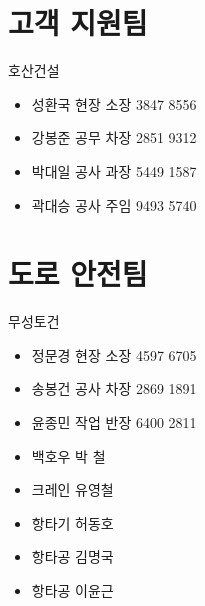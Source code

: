 \documentclass[aspectratio=1610,17pt,xcolor=pdftex,dvipsnames,table,handout]{beamer}
\begin{document}
		\section{ 고객 지원팀 }
		\frame [plain] {\sectionpage}


		\begin{frame} [t,plain]
			\begin{block} {호산건설  }
			\begin{itemize}
				\item 성환국 현장 소장 3847 8556
				\item 강봉준 공무 차장 2851 9312
				\item 박대일 공사 과장 5449 1587
				\item 곽대승 공사 주임 9493 5740
			\end{itemize}
			\end{block}
		\end{frame}


		\section{ 도로 안전팀 }
		\frame [plain] {\sectionpage}


		\begin{frame} [t,plain]
			\begin{block} {무성토건 }
			\begin{itemize}
				\item 정문경 현장 소장 4597 6705
				\item 송봉건 공사 차장 2869 1891
				\item 윤종민 작업 반장 6400 2811
				\item 백호우 박  철
				\item 크레인 유영철
				\item 항타기 허동호
				\item 항타공 김명국
				\item 항타공 이윤근
			\end{itemize}
			\end{block}
		\end{frame}


\end{document}
